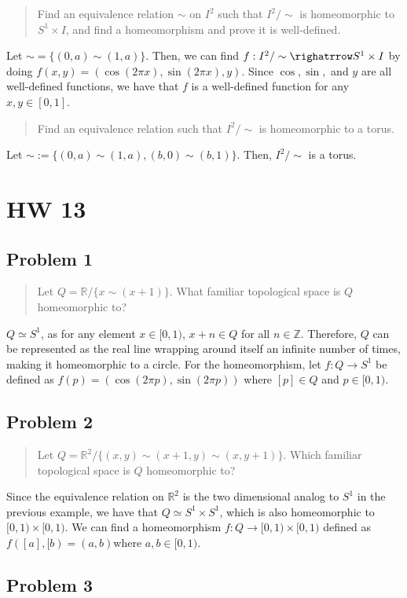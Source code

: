 \documentclass[8pt]{extarticle}
\begin{document}
{\begin{quote}
	Find an equivalence relation $\sim$ on $I^2$ such that $I^2/\sim$ is homeomorphic to $S^{1}\times I$, and find a homeomorphism and prove it is well-defined.
\end{quote}
Let $\sim = \{(0,a)\sim (1,a)\}$. Then, we can find $f:I^2/\sim \righatrrow S^{1}\times I$ by doing $f(x,y) = (\cos(2\pi x),\sin(2\pi x), y)$. Since $\cos, \sin,$ and $y$ are all well-defined functions, we have that $f$ is a well-defined function for any $x,y\in [0,1]$.
\begin{quote}
	Find an equivalence relation such that $I^{2}/\sim$ is homeomorphic to a torus.
\end{quote}
Let $\sim := \{(0,a)\sim(1,a),(b,0)\sim(b,1)\}$. Then, $I^2/\sim$ is a torus.
\pagebreak
\section*{HW 13}%
\subsection*{Problem 1}%
\begin{quote}
	Let $Q = \mathbb{R}/\{x\sim(x+1)\}$. What familiar topological space is $Q$ homeomorphic to?
\end{quote}
$Q \simeq S^{1}$, as for any element $x\in [0,1)$, $x+n\in Q$ for all $n\in \mathbb{Z}$. Therefore, $Q$ can be represented as the real line wrapping around itself an infinite number of times, making it homeomorphic to a circle. For the homeomorphism, let $f:Q\rightarrow S^{1}$ be defined as $f(p) = (\cos(2\pi p),\sin(2\pi p))$ where $[p]\in Q$ and $p \in [0,1)$.
\subsection*{Problem 2}%
\begin{quote}
	Let $Q = \mathbb{R}^2/\{(x,y)\sim(x+1,y)\sim(x,y+1)\}$. Which familiar topological space is $Q$ homeomorphic to?
\end{quote}
Since the equivalence relation on $\mathbb{R}^2$ is the two dimensional analog to $S^1$ in the previous example, we have that $Q \simeq S^1\times S^1$, which is also homeomorphic to $[0,1)\times [0,1)$. We can find a homeomorphism $f:Q\rightarrow [0,1)\times [0,1)$ defined as $f([a],[b) = (a,b)$where $a,b\in [0,1)$.
\subsection*{Problem 3}%

}
\end{document}
